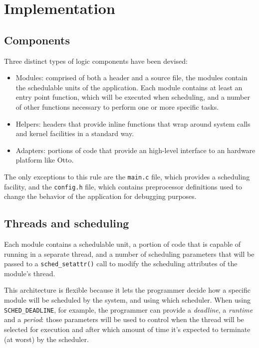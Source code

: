 \documentclass[a4paper,12pt]{report}
\begin{document}
\section{Implementation}

\subsection{Components}

Three distinct types of logic components have been devised:
\begin{itemize}
    \item Modules: comprised of both a header and a source file, the modules contain the schedulable units of the application. Each module contains at least an entry point function, which will be executed when scheduling, and a number of other functions necessary to perform one or more specific tasks.   
    \item Helpers: headers that provide inline functions that wrap around system calls and kernel facilities in a standard way.
    \item Adapters: portions of code that provide an high-level interface to an hardware platform like Otto.
\end{itemize}

The only exceptions to this rule are the \texttt{main.c} file, which provides a scheduling facility, and the \texttt{config.h} file, which contains preprocessor definitions used to change the behavior of the application for debugging purposes.

\subsection{Threads and scheduling}

Each module contains a schedulable unit, a portion of code that is capable of running in a separate thread, and a number of scheduling parameters that will be passed to a \texttt{sched\_setattr()} call to modify the scheduling attributes of the module's thread.

This architecture is flexible because it lets the programmer decide how a specific module will be scheduled by the system, and using which scheduler. When using \texttt{SCHED\_DEADLINE}, for example, the programmer can provide a \textit{deadline}, a \textit{runtime} and a \textit{period}: those parameters will be used to control when the thread will be selected for execution and after which amount of time it's expected to terminate (at worst) by the scheduler.
\end{document}

